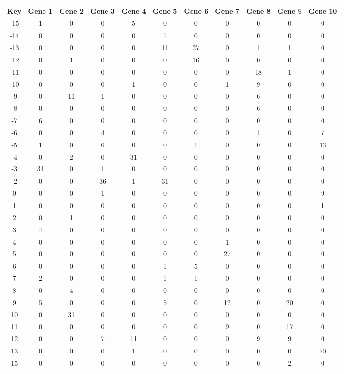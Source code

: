 \begin{tabular}{|c|c|c|c|c|c|c|c|c|c|c|}
\hline
Key & Gene 1 & Gene 2 & Gene 3 & Gene 4 & Gene 5 & Gene 6 & Gene 7 & Gene 8 & Gene 9 & Gene 10 \\
\hline
-15 & 1 & 0 & 0 & 5 & 0 & 0 & 0 & 0 & 0 & 0 \\
-14 & 0 & 0 & 0 & 0 & 1 & 0 & 0 & 0 & 0 & 0 \\
-13 & 0 & 0 & 0 & 0 & 11 & 27 & 0 & 1 & 1 & 0 \\
-12 & 0 & 1 & 0 & 0 & 0 & 16 & 0 & 0 & 0 & 0 \\
-11 & 0 & 0 & 0 & 0 & 0 & 0 & 0 & 18 & 1 & 0 \\
-10 & 0 & 0 & 0 & 1 & 0 & 0 & 1 & 9 & 0 & 0 \\
-9 & 0 & 11 & 1 & 0 & 0 & 0 & 0 & 6 & 0 & 0 \\
-8 & 0 & 0 & 0 & 0 & 0 & 0 & 0 & 6 & 0 & 0 \\
-7 & 6 & 0 & 0 & 0 & 0 & 0 & 0 & 0 & 0 & 0 \\
-6 & 0 & 0 & 4 & 0 & 0 & 0 & 0 & 1 & 0 & 7 \\
-5 & 1 & 0 & 0 & 0 & 0 & 1 & 0 & 0 & 0 & 13 \\
-4 & 0 & 2 & 0 & 31 & 0 & 0 & 0 & 0 & 0 & 0 \\
-3 & 31 & 0 & 1 & 0 & 0 & 0 & 0 & 0 & 0 & 0 \\
-2 & 0 & 0 & 36 & 1 & 31 & 0 & 0 & 0 & 0 & 0 \\
0 & 0 & 0 & 1 & 0 & 0 & 0 & 0 & 0 & 0 & 9 \\
1 & 0 & 0 & 0 & 0 & 0 & 0 & 0 & 0 & 0 & 1 \\
2 & 0 & 1 & 0 & 0 & 0 & 0 & 0 & 0 & 0 & 0 \\
3 & 4 & 0 & 0 & 0 & 0 & 0 & 0 & 0 & 0 & 0 \\
4 & 0 & 0 & 0 & 0 & 0 & 0 & 1 & 0 & 0 & 0 \\
5 & 0 & 0 & 0 & 0 & 0 & 0 & 27 & 0 & 0 & 0 \\
6 & 0 & 0 & 0 & 0 & 1 & 5 & 0 & 0 & 0 & 0 \\
7 & 2 & 0 & 0 & 0 & 1 & 1 & 0 & 0 & 0 & 0 \\
8 & 0 & 4 & 0 & 0 & 0 & 0 & 0 & 0 & 0 & 0 \\
9 & 5 & 0 & 0 & 0 & 5 & 0 & 12 & 0 & 20 & 0 \\
10 & 0 & 31 & 0 & 0 & 0 & 0 & 0 & 0 & 0 & 0 \\
11 & 0 & 0 & 0 & 0 & 0 & 0 & 9 & 0 & 17 & 0 \\
12 & 0 & 0 & 7 & 11 & 0 & 0 & 0 & 9 & 9 & 0 \\
13 & 0 & 0 & 0 & 1 & 0 & 0 & 0 & 0 & 0 & 20 \\
15 & 0 & 0 & 0 & 0 & 0 & 0 & 0 & 0 & 2 & 0 \\
\hline
\end{tabular}